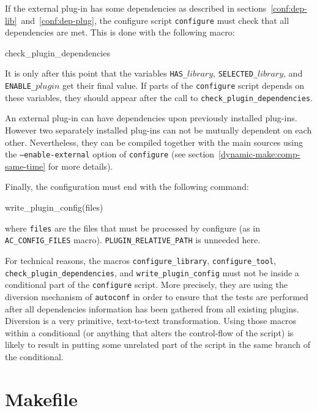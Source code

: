 If the external plug-in has some dependencies as described in
sections~\ref{conf:dep-lib}~and~\ref{conf:dep-plug},
the configure script \texttt{configure} must check that all dependencies
are met. This is done with the following macro:
\begin{configurecode}
check_plugin_dependencies
\end{configurecode}
It is only after this point that the variables
\texttt{HAS\_$library$}, \texttt{SELECTED\_$library$}, and
\texttt{ENABLE\_$plugin$} get their final value. If parts of the
\texttt{configure} script depends on these variables,
they should appear after the call to
\texttt{check\_plugin\_dependencies}.

An external plug-in can
have dependencies upon previously installed plug-ins.
However two separately installed plug-ins can not be
mutually dependent on each other. Nevertheless, they can be compiled together
with the main \framac sources using the \texttt{---enable-external} option
of \texttt{configure} (see section~\ref{dynamic-make:comp-same-time}
for more details).

Finally, the configuration must end with the following command:
\begin{configurecode}
write_plugin_config(files)
\end{configurecode}
where \texttt{files} are the files that must be processed by configure
(as in \texttt{AC\_CONFIG\_FILES} macro). \texttt{PLUGIN\_RELATIVE\_PATH} is
unneeded here.

\begin{important}
For technical reasons, the macros
\texttt{configure\_library}, \texttt{configure\_tool}, 
\texttt{check\_plugin\_dependencies}, and \texttt{write\_plugin\_config}
must not be inside a conditional part of the \texttt{configure}
script. More precisely,
they are using the diversion mechanism of \texttt{autoconf} in order to
ensure that the tests are performed after all dependencies information
has been gathered from all existing plugins. Diversion is a very primitive,
text-to-text transformation. Using those macros within a
conditional (or anything that alters the control-flow of the script) is likely
to result in putting some unrelated part of the script in the same branch of
the conditional.
\end{important}


\section{\framac Makefile}\label{adv:make}

